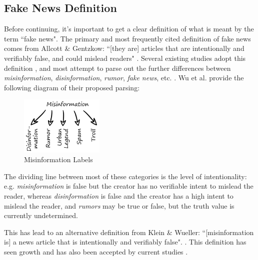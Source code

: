 \documentclass[preprint,review,12pt]{elsarticle}
\begin{document}
\subsection{Fake News Definition}
\label{Fake News Definition Section}
Before continuing, it's important to get a clear definition of what is meant by the term ``fake news". The primary and most frequently cited definition of fake news comes from Allcott \& Gentzkow: ``[they are] articles that are intentionally and verifiably false, and could mislead readers" \cite{allcott2017social}. Several existing studies adopt this definition \cite{conroy2015automatic,klein2017fake,rubin2015deception,rubin2017deception,mustafaraj2017fake,potthast2017stylometric}, and most attempt to parse out the further differences between \textit{misinformation}, \textit{disinformation}, \textit{rumor}, \textit{fake news}, etc. \cite{zimdars2020fake,  difonzo2007rumor,flynn2017nature,garrett2013undermining,wu2016mining}. Wu et al. provide the following diagram of their proposed parsing:
 \begin{figure}[htp]
    \centering
    \includegraphics[width=4cm]{misinformation graphic.png}
    \caption{Misinformation Labels \cite{wu2016mining}}
    \label{fig:misinformation graphic.png}
\end{figure}


The dividing line between most of these categories is the level of intentionality: e.g. \textit{misinformation} is false but the creator has no verifiable  intent to mislead the reader, whereas \textit{disinformation} is false and the creator has a high intent to mislead the reader, and \textit{rumors} may be true or false, but the truth value is currently undetermined.

This has lead to an alternative definition from Klein \& Wueller: ``[misinformation is] a news article that is intentionally and verifiably false". \cite{klein2017fake}. This definition has seen growth and has also been accepted by current studies \cite{shu2017fake, liu2018early}.
\end{document}
